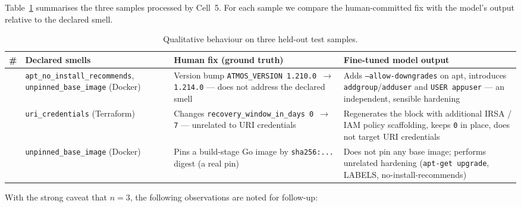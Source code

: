 \documentclass[12pt, a4paper]{report}
\begin{document}
Table~\ref{tab:qualitative} summarises the three samples processed by
Cell~5. For each sample we compare the human-committed fix with the
model's output relative to the declared smell.

\begin{table}[H]
  \centering
  \caption{Qualitative behaviour on three held-out test samples.}
  \label{tab:qualitative}
  \footnotesize
  \setlength{\tabcolsep}{6pt}
  \renewcommand{\arraystretch}{1.25}
  \begin{tabular}{@{}>{\raggedright\arraybackslash}p{0.4cm}
                    >{\raggedright\arraybackslash}p{3.0cm}
                    >{\raggedright\arraybackslash}p{4.4cm}
                    >{\raggedright\arraybackslash}p{4.6cm}@{}}
    \toprule
    \textbf{\#} & \textbf{Declared smells} & \textbf{Human fix (ground truth)} & \textbf{Fine-tuned model output} \\
    \midrule
    1 & \texttt{apt\_no\_install\_\allowbreak recommends},
        \texttt{unpinned\_\allowbreak base\_image} (Docker)
      & Version bump
        \texttt{ATMOS\_VERSION 1.210.0 $\to$ 1.214.0} --- does not address
        the declared smell
      & Adds \texttt{--allow-downgrades} on apt, introduces
        \texttt{addgroup}/\texttt{adduser} and \texttt{USER appuser} ---
        an independent, sensible hardening \\
    \addlinespace[4pt]
    2 & \texttt{uri\_credentials} (Terraform)
      & Changes \texttt{recovery\_window\_in\_days 0 $\to$ 7} ---
        unrelated to URI credentials
      & Regenerates the block with additional IRSA / IAM policy
        scaffolding, keeps \texttt{0} in place, does not target URI
        credentials \\
    \addlinespace[4pt]
    3 & \texttt{unpinned\_\allowbreak base\_image} (Docker)
      & Pins a build-stage Go image by \texttt{sha256:...} digest
        (a real pin)
      & Does not pin any base image; performs unrelated hardening
        (\texttt{apt-get upgrade}, LABELS, no-install-recommends) \\
    \bottomrule
  \end{tabular}
\end{table}

With the strong caveat that \(n=3\), the following observations are
noted for follow-up:
\end{document}
